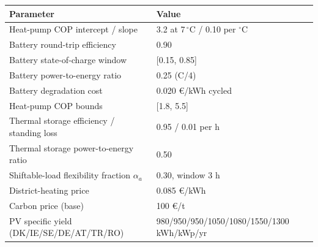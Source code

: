\begin{tabularx}{\textwidth}{@{}>{\raggedright\arraybackslash}p{6.2cm}X@{}}
\toprule
Parameter & Value \\
\midrule
Heat-pump COP intercept / slope & 3.2 at 7\,$^\circ$C / 0.10 per $^\circ$C \\
Battery round-trip efficiency & 0.90 \\
Battery state-of-charge window & [0.15, 0.85] \\
Battery power-to-energy ratio & 0.25 (C/4) \\
Battery degradation cost & 0.020 \euro/kWh cycled \\
Heat-pump COP bounds & [1.8, 5.5] \\
Thermal storage efficiency / standing loss & 0.95 / 0.01 per h \\
Thermal storage power-to-energy ratio & 0.50 \\
Shiftable-load flexibility fraction $\alpha_a$ & 0.30, window 3 h \\
District-heating price & 0.085 \euro/kWh \\
Carbon price (base) & 100 \euro/t \\
PV specific yield (DK/IE/SE/DE/AT/TR/RO) & 980/950/950/1050/1080/1550/1300 kWh/kWp/yr \\
\bottomrule
\end{tabularx}

